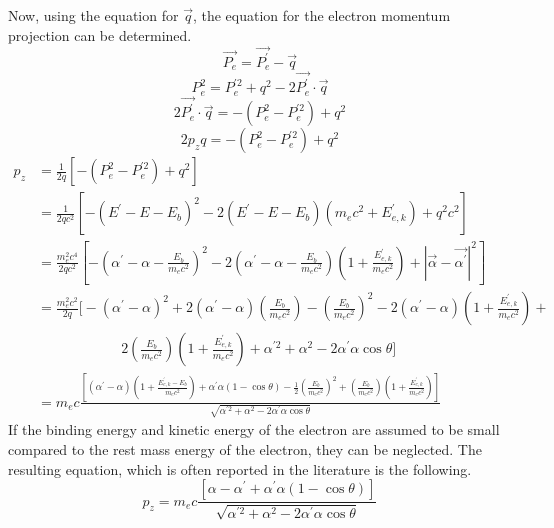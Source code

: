 Now, using the equation for $\vec{q}$, the equation for the electron momentum 
projection can be determined.
\begin{equation*}
  \vec{P_e} = \vec{P_e^{'}} - \vec{q}
\end{equation*}
\begin{equation*}
  P_e^2 = P_e^{'2} + q^2 - 2\vec{P_e^{'}}\cdot\vec{q}
\end{equation*}
\begin{equation*}
  2\vec{P_e^{'}}\cdot\vec{q} = -\left(P_e^2 - P_e^{'2}\right) + q^2
\end{equation*}
\begin{equation*}
  2p_zq = -\left(P_e^2 - P_e^{'2}\right) + q^2 \nonumber
\end{equation*}
\begin{align}
  p_z & = \frac{1}{2q}\left[-\left(P_e^2 - P_e^{'2}\right) + q^2\right] 
  \nonumber \\
  & = \frac{1}{2qc^2}\left[-(E^{'}-E-E_b)^2 - 2(E^{'}-E-E_b)(m_ec^2+E_{e,k}^{'})
    +q^2c^2\right] \nonumber \\
  & = \frac{m_e^2c^4}{2qc^2}\left[
    -\left(\alpha^{'}-\alpha-\frac{E_b}{m_ec^2}\right)^2 -
    2\left(\alpha^{'}-\alpha-\frac{E_b}{m_ec^2}\right)
    \left(1 + \frac{E_{e,k}^{'}}{m_ec^2}\right) + 
    \left|\vec{\alpha} - \vec{\alpha^{'}}\right|^2\right] \nonumber \\
  & = \frac{m_e^2c^2}{2q}\Bigg[-(\alpha^{'}-\alpha)^2 + 
    2(\alpha^{'}-\alpha)\left(\frac{E_b}{m_ec^2}\right) - 
    \left(\frac{E_b}{m_ec^2}\right)^2 -
    2(\alpha^{'}-\alpha)\left(1 + \frac{E_{e,k}^{'}}{m_ec^2}\right) + \nonumber \\
  & \qquad \qquad \qquad
    2\left(\frac{E_b}{m_ec^2}\right)\left(1 + \frac{E_{e,k}^{'}}{m_ec^2}\right) +
    \alpha^{'2} + \alpha^2 - 2\alpha^{'}\alpha\cos{\theta}\Bigg] \nonumber \\
  & = m_ec\frac{\left[(\alpha^{'}-\alpha)\left(1 + \frac{E_{e,k}^{'} - E_b}{m_ec^2}
    \right) + \alpha^{'}\alpha(1-\cos{\theta}) -
    \frac{1}{2}\left(\frac{E_b}{m_ec^2}\right)^2 + 
    \left(\frac{E_b}{m_ec^2}\right)\left(1 + \frac{E_{e,k}^{'}}{m_ec^2}\right)
    \right]} {\sqrt{\alpha^{'2} + \alpha^2 - 2\alpha^{'}\alpha\cos{\theta}}}
\end{align}
If the binding energy and kinetic energy of the electron are assumed to be 
small compared to the rest mass energy of the electron, they can be neglected. 
The resulting equation, which is often reported in the literature is the 
following.
\begin{equation}
  p_z = m_ec\frac{\left[\alpha - \alpha^{'} + \alpha^{'}\alpha(1-\cos{\theta})
      \right]}{\sqrt{\alpha^{'2} + \alpha^2 - 2\alpha^{'}\alpha\cos{\theta}}}
\end{equation}

